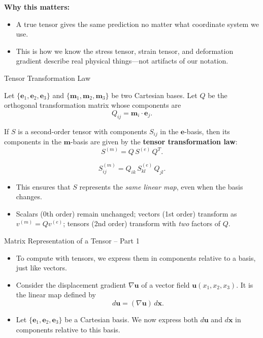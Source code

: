 \documentclass{beamer}
\begin{document}
\begin{frame}

\textbf{Why this matters:}
\begin{itemize}
    \item A true tensor gives the same prediction no matter what coordinate system we use.
    \item This is how we know the stress tensor, strain tensor, and deformation gradient
          describe real physical things—not artifacts of our notation.
\end{itemize}

\end{frame}


\begin{frame}{Tensor Transformation Law}

Let $\{ \mathbf{e}_1, \mathbf{e}_2, \mathbf{e}_3 \}$ and 
$\{ \mathbf{m}_1, \mathbf{m}_2, \mathbf{m}_3 \}$ be two Cartesian bases.
Let $Q$ be the orthogonal transformation matrix whose components are
\[
Q_{ij} = \mathbf{m}_i \cdot \mathbf{e}_j .
\]

\medskip
If $S$ is a second-order tensor with components $S_{ij}$ in the 
$\mathbf{e}$-basis, then its components in the 
$\mathbf{m}$-basis are given by the \textbf{tensor transformation law}:
\[
S^{(m)} = Q\, S^{(e)}\, Q^{T}.
\]

\[
S^{(m)}_{ij} 
= 
Q_{ik}\, S^{(e)}_{kl}\, Q_{jl}.
\]

\medskip
\begin{itemize}
\item This ensures that $S$ represents the \emph{same linear map}, even when the basis changes.
\item Scalars (0th order) remain unchanged; vectors (1st order) transform as $v^{(m)} = Q v^{(e)}$;  
  tensors (2nd order) transform with \emph{two} factors of $Q$.
\end{itemize}

\end{frame}

\begin{frame}{Matrix Representation of a Tensor -- Part 1}

\begin{itemize}

\item To compute with tensors, we express them in components relative to a basis,
just like vectors.

\item Consider the displacement gradient \(\nabla \mathbf{u}\) of a vector field
\(\mathbf{u}(x_1,x_2,x_3)\).  
It is the linear map defined by
\[
d\mathbf{u} = (\nabla \mathbf{u})\, d\mathbf{x}.
\]

\item Let \(\{ \mathbf{e}_1,\mathbf{e}_2,\mathbf{e}_3 \}\) be a Cartesian basis.
We now express both \(d\mathbf{u}\) and \(d\mathbf{x}\) in components relative to this basis.

\end{itemize}

\end{frame}
\end{document}
